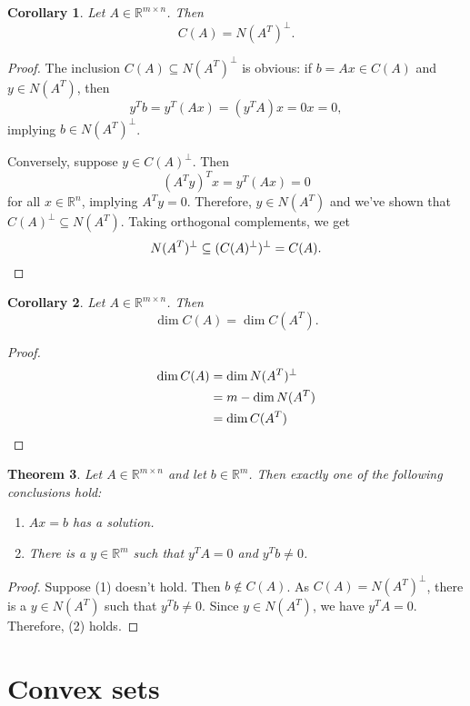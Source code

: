 \documentclass[12pt]{amsart}
\newtheorem{theorem}{Theorem}[section]
\newtheorem{corollary}[theorem]{Corollary}
\theoremstyle{definition}
\theoremstyle{remark}
\numberwithin{equation}{section}
\newcommand{\RR}{\mathbb{R}}
\begin{document}
\begin{corollary}
    Let $A\in\RR^{m\times n}$. Then
    \[
        C(A) = N(A^T)^\perp.
    \]
\end{corollary}
\begin{proof}
    The inclusion $C(A)\subseteq N(A^T)^\perp$ is obvious:
    if $b=Ax\in C(A)$ and $y\in N(A^T)$, then
    \[
        y^Tb = y^T(Ax) = (y^TA)x = 0x = 0, 
    \]
    implying $b\in N(A^T)^\perp$.

    Conversely, suppose $y\in C(A)^\perp$. Then
    \[(A^Ty)^Tx = y^T(Ax) = 0\]
    for all $x\in\RR^n$, implying $A^Ty=0$. Therefore, $y\in N(A^T)$ and
    we've shown that $C(A)^\perp\subseteq N(A^T)$.
    Taking orthogonal complements, we get
    \[
        N(A^T)^\perp\subseteq (C(A)^\perp)^\perp = C(A).\qedhere
    \]
\end{proof}

\begin{corollary}
    Let $A\in\RR^{m\times n}$. Then
    \[\dim C(A) = \dim C(A^T).\]
\end{corollary}

\begin{proof}
    \begin{align*}
        \dim C(A) &= \dim N(A^T)^\perp\\
        &= m - \dim N(A^T)\\
        &= \dim C(A^T)\qedhere
    \end{align*}
\end{proof}

\begin{theorem}
    Let $A\in\RR^{m\times n}$ and let $b\in\RR^m$.
    Then exactly one of the following conclusions hold:
    \begin{enumerate}
        \item $Ax=b$ has a solution.
        \item There is a $y\in\RR^m$ such that $y^TA=0$ and $y^Tb\neq 0$.
    \end{enumerate}
\end{theorem}

\begin{proof}
    Suppose (1) doesn't hold. Then $b\notin C(A)$.
    As $C(A)=N(A^T)^\perp$, there is a $y\in N(A^T)$ such that $y^Tb\neq 0$.
    Since $y\in N(A^T)$, we have $y^TA=0$. Therefore, (2) holds.
\end{proof}

\section{Convex sets}
\end{document}
